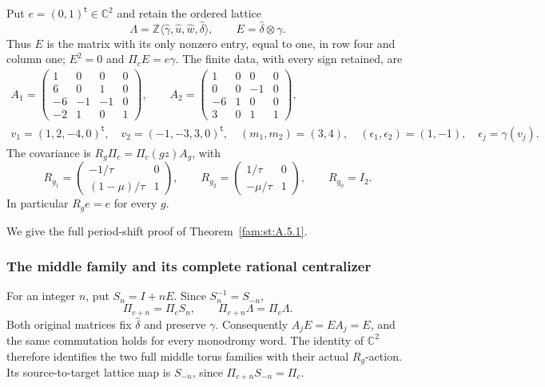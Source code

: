 Put $e=(0,1)^{\mathsf t}\in\mathbb C^2$ and retain the ordered lattice
\[
 \Lambda=\mathbb Z\langle\widehat\gamma,\widehat u,
                        \widehat w,\widehat\delta\rangle,
 \qquad E=\widehat\delta\otimes\gamma.
 \tag{PS2}\label{wb:pshift:eq:rank-one-map}
\]
Thus $E$ is the matrix with its only nonzero entry, equal to one, in
row four and column one; $E^2=0$ and $\Pi_cE=e\gamma$.
The finite data, with every sign retained, are
\[
\begin{gathered}
 A_1=\begin{pmatrix}1&0&0&0\\6&0&1&0\\-6&-1&-1&0\\-2&1&0&1\end{pmatrix},
 \qquad
 A_2=\begin{pmatrix}1&0&0&0\\0&0&-1&0\\-6&1&0&0\\3&0&1&1\end{pmatrix},\\
 v_1=(1,2,-4,0)^{\mathsf t},\quad
 v_2=(-1,-3,3,0)^{\mathsf t},\quad
 (m_1,m_2)=(3,4),\quad
 (\epsilon_1,\epsilon_2)=(1,-1),\quad \epsilon_j=\gamma(v_j).
\end{gathered}
\tag{PS3}\label{wb:pshift:eq:finite-data}
\]
The covariance is $R_g\Pi_c=\Pi_c(gz)A_g$, with
\[
 R_{g_1}=\begin{pmatrix}-1/\tau&0\\(1-\mu)/\tau&1\end{pmatrix},\qquad
 R_{g_2}=\begin{pmatrix}1/\tau&0\\-\mu/\tau&1\end{pmatrix},\qquad
 R_{g_0}=I_2.
 \tag{PS4}\label{wb:pshift:eq:covariance}
\]
In particular $R_ge=e$ for every $g$.

We give the full period-shift proof of Theorem~\ref{fam:st:A.5.1}.


\subsubsection{The middle family and its complete rational centralizer}

For an integer $n$, put $S_n=I+nE$. Since $S_n^{-1}=S_{-n}$,
\[
 \Pi_{c+n}=\Pi_c S_n,\qquad
 \Pi_{c+n}\Lambda=\Pi_c\Lambda.
 \tag{PS6}\label{wb:pshift:eq:integer-shear}
\]
Both original matrices fix $\widehat\delta$ and preserve $\gamma$.
Consequently $A_jE=EA_j=E$, and the same commutation holds for every
monodromy word. The identity of $\mathbb C^2$ therefore identifies
the two full middle torus families with their actual $R_g$-action.
Its source-to-target lattice map is $S_{-n}$, since
$\Pi_{c+n}S_{-n}=\Pi_c$.

